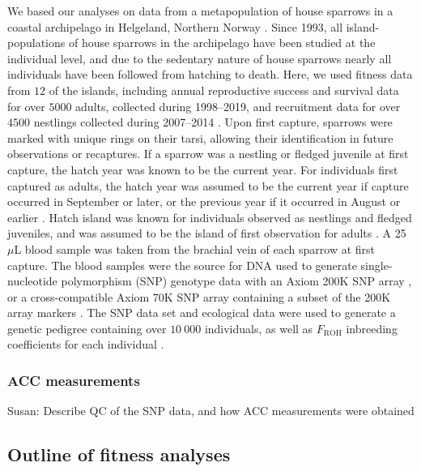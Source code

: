 \documentclass[dvipsnames]{article}
\begin{document}
We based our analyses on data from a metapopulation of house sparrows in a coastal archipelago in Helgeland, Northern Norway \citep{jensen2013genetic, ranke2021spatial}.
Since 1993, all island-populations of house sparrows in the archipelago have been studied at the individual level, and due to the sedentary nature of house sparrows nearly all individuals have been followed from hatching to death.
Here, we used fitness data from $12$ of the islands, including annual reproductive success and survival data for over $5000$ adults, collected during 1998--2019, and recruitment data for over $4500$ nestlings collected during 2007--2014 \citep{saatoglu2025metapopulation}.
Upon first capture, sparrows were marked with unique rings on their tarsi, allowing their identification in future observations or recaptures.
If a sparrow was a nestling or fledged juvenile at first capture, the hatch year was known to be the current year.
For individuals first captured as adults, the hatch year was assumed to be the current year if capture occurred in September or later, or the previous year if it occurred in August or earlier \citep{niskanen2020consistent, araya2021variation}. %
Hatch island was known for individuals observed as nestlings and fledged juveniles, and was assumed to be the island of first observation for adults \citep[around $17\%$ of recruits dispersed between islands in the metapopulation during their first fall, see][]{ranke2021spatial}.
A 25 $\mu$L blood sample was taken from the brachial vein of each sparrow at first capture.
The blood samples were the source for DNA used to generate single-nucleotide polymorphism (SNP) genotype data with an Axiom 200K SNP array \citep{lundregan2018inferences, niskanen2020consistent}, or a cross-compatible Axiom 70K SNP array containing a subset of the 200K array markers \citep{burnett2026snps}.
The SNP data set and ecological data were used to generate a genetic pedigree containing over $10\ 000$ individuals, as well as $F_\text{ROH}$ inbreeding coefficients for each individual \citep[see][for details]{burnett2026snps}.

\subsubsection*{ACC measurements}

Susan: Describe QC of the SNP data, and how ACC measurements were obtained

\subsection*{Outline of fitness analyses}
\end{document}
